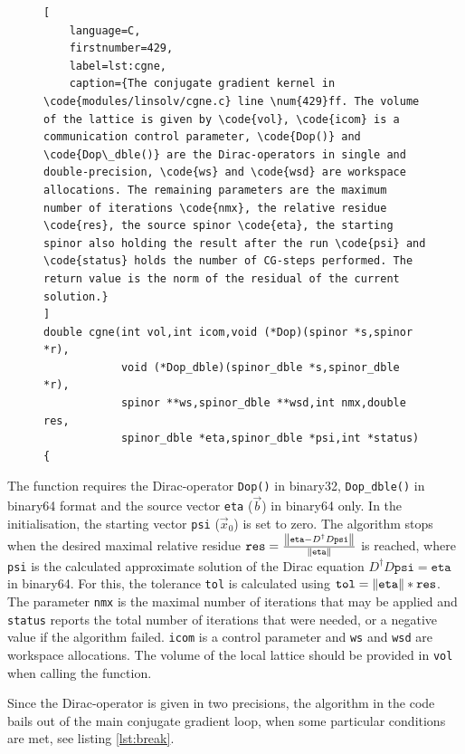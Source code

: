 \documentclass{article}
\theoremstyle{plain} %
\theoremstyle{convention} %
\theoremstyle{remark} %
\def\code#1{\texttt{#1}}
\numberwithin{equation}{section}
\begin{document}
\begin{figure} %
\begin{lstlisting}[
    language=C,
    firstnumber=429,
    label=lst:cgne,
    caption={The conjugate gradient kernel in \code{modules/linsolv/cgne.c} line \num{429}ff. The volume of the lattice is given by \code{vol}, \code{icom} is a communication control parameter, \code{Dop()} and \code{Dop\_dble()} are the Dirac-operators in single and double-precision, \code{ws} and \code{wsd} are workspace allocations. The remaining parameters are the maximum number of iterations \code{nmx}, the relative residue \code{res}, the source spinor \code{eta}, the starting spinor also holding the result after the run \code{psi} and \code{status} holds the number of CG-steps performed. The return value is the norm of the residual of the current solution.}
]
double cgne(int vol,int icom,void (*Dop)(spinor *s,spinor *r),
            void (*Dop_dble)(spinor_dble *s,spinor_dble *r),
            spinor **ws,spinor_dble **wsd,int nmx,double res,
            spinor_dble *eta,spinor_dble *psi,int *status)
{
\end{lstlisting}
\end{figure} 

The function requires the Dirac-operator \code{Dop()} in \gls{binary32}, \code{Dop\_dble()} in \gls{binary64} format and the source vector \code{eta} ($\vec{b}$) in \gls{binary64} only. In the initialisation, the starting vector \code{psi} ($\vec{x}_0$) is set to zero. The algorithm stops when the desired maximal relative residue $\code{res} =\frac{\norm{\code{eta}-D^\dagger D \code{psi}}}{\norm{\code{eta}}}$ is reached, where \code{psi} is the calculated approximate solution of the Dirac equation $D^\dagger D \code{psi}=\code{eta}$ in \gls{binary64}. For this, the tolerance \code{tol} is calculated using $\code{tol} = \norm{\code{eta}} * \code{res}$. The parameter \code{nmx} is the maximal number of iterations that may be applied and \code{status} reports the total number of iterations that were needed, or a negative value if the algorithm failed. \code{icom} is a control parameter and \code{ws} and \code{wsd} are workspace allocations. The volume of the local lattice should be provided in \code{vol} when calling the function.

Since the Dirac-operator is given in two precisions, the algorithm in the code bails out of the main conjugate gradient loop, when some particular conditions are met, see listing \ref{lst:break}.
\end{document}
